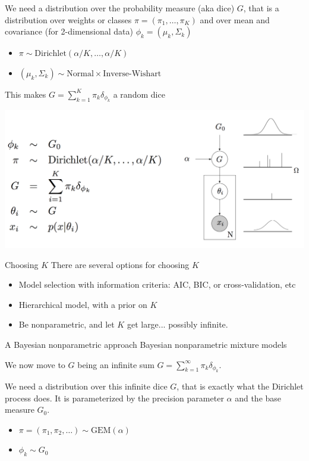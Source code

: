 We need a distribution over the probability measure (aka dice) $G$, that is a distribution over weights or classes $\pi = (\pi_1,\ldots,\pi_K)$ and over mean and covariance (for 2-dimensional data) $\phi_k = (\mu_k,\Sigma_k)$

\begin{itemize}
	\item $\pi\sim \text{Dirichlet}(\alpha/K, \ldots,\alpha/K)$
	\item $(\mu_k,\Sigma_k)\sim \text{Normal}\times\text{Inverse-Wishart}$
\end{itemize}
This makes $G = \sum_{k=1}^K \pi_k \delta_{\phi_k}$ a random dice

\begin{center}
		\includegraphics[width=.8\textwidth]{figures_julyan/mixtures/plate_bayes_mixture}
\end{center}


{Choosing $K$}
There are several options for choosing $K$
\begin{itemize}
	\item Model selection with information criteria: AIC, BIC, or cross-validation, etc
	\item Hierarchical model, with a prior on $K$
	\item Be nonparametric, and let $K$ get large... possibly infinite.
\end{itemize}
	




{A {Bayesian nonparametric} approach}
	 \alert{Bayesian nonparametric}   mixture models
	 
	 We now move to $G$ being an infinite sum $G = \sum_{k=1}^\infty \pi_k \delta_{\phi_k}$.
	
We need a distribution over this infinite dice $G$, that is exactly what the \alert{Dirichlet process} does. It is parameterized by the precision parameter $\alpha$ and the base measure $G_0$.


\begin{itemize}
	\item $\pi = (\pi_1,\pi_2,\ldots)\sim \text{GEM}(\alpha)$
	\item $\phi_k\sim G_0$
\end{itemize}

